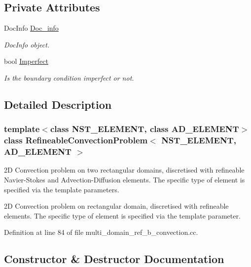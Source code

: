 \subsection*{Private Attributes}
\begin{DoxyCompactItemize}
\item 
Doc\+Info \hyperlink{classRefineableConvectionProblem_acf0b222e2ae8efc508536e578c3a359e}{Doc\+\_\+info}
\begin{DoxyCompactList}\small\item\em Doc\+Info object. \end{DoxyCompactList}\item 
bool \hyperlink{classRefineableConvectionProblem_af5a23ac1fe5407159089c5909e86f026}{Imperfect}
\begin{DoxyCompactList}\small\item\em Is the boundary condition imperfect or not. \end{DoxyCompactList}\end{DoxyCompactItemize}


\subsection{Detailed Description}
\subsubsection*{template$<$class N\+S\+T\+\_\+\+E\+L\+E\+M\+E\+NT, class A\+D\+\_\+\+E\+L\+E\+M\+E\+NT$>$\newline
class Refineable\+Convection\+Problem$<$ N\+S\+T\+\_\+\+E\+L\+E\+M\+E\+N\+T, A\+D\+\_\+\+E\+L\+E\+M\+E\+N\+T $>$}

2D Convection problem on two rectangular domains, discretised with refineable Navier-\/\+Stokes and Advection-\/\+Diffusion elements. The specific type of element is specified via the template parameters.

2D Convection problem on rectangular domain, discretised with refineable elements. The specific type of element is specified via the template parameter. 

Definition at line 84 of file multi\+\_\+domain\+\_\+ref\+\_\+b\+\_\+convection.\+cc.



\subsection{Constructor \& Destructor Documentation}
\mbox{\label{classRefineableConvectionProblem_a97e661986093402bf55fb6c32b782ddc}} 
